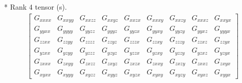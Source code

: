 \documentclass[fleqn,8pt,landscape]{jsarticle}
\begin{document}
* Rank 4 tensor (s).
\begin{align*}
\begin{bmatrix} G_{xxxx} & G_{xxyy} & G_{xxzz} & G_{xxyz} & G_{xxzx} & G_{xxxy} & G_{xxzy} & G_{xxxz} & G_{xxyx} \\ G_{yyxx} & G_{yyyy} & G_{yyzz} & G_{yyyz} & G_{yyzx} & G_{yyxy} & G_{yyzy} & G_{yyxz} & G_{yyyx} \\ G_{zzxx} & G_{zzyy} & G_{zzzz} & G_{zzyz} & G_{zzzx} & G_{zzxy} & G_{zzzy} & G_{zzxz} & G_{zzyx} \\ G_{yzxx} & G_{yzyy} & G_{yzzz} & G_{yzyz} & G_{yzzx} & G_{yzxy} & G_{yzzy} & G_{yzxz} & G_{yzyx} \\ G_{zxxx} & G_{zxyy} & G_{zxzz} & G_{zxyz} & G_{zxzx} & G_{zxxy} & G_{zxzy} & G_{zxxz} & G_{zxyx} \\ G_{xyxx} & G_{xyyy} & G_{xyzz} & G_{xyyz} & G_{xyzx} & G_{xyxy} & G_{xyzy} & G_{xyxz} & G_{xyyx} \end{bmatrix}
\end{align*}
\end{document}
